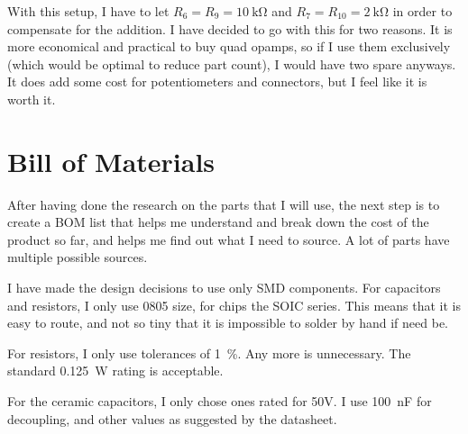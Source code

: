 \documentclass[a4paper]{article}
\begin{document}
With this setup, I have to let $R_6 = R_9 = \SI{10}{\kilo\ohm}$ and $R_7 = R_{10} = \SI{2}{\kilo\ohm}$ in order to compensate for the addition. I have decided to go with this for two reasons. It is more economical and practical to buy quad opamps, so if I use them exclusively (which would be optimal to reduce part count), I would have two spare anyways. It does add some cost for potentiometers and connectors, but I feel like it is worth it.

\section{Bill of Materials}

After having done the research on the parts that I will use, the next step is to create a BOM list that helps me understand and break down the cost of the product so far, and helps me find out what I need to source. A lot of parts have multiple possible sources.

I have made the design decisions to use only SMD components. For capacitors and resistors, I only use 0805 size, for chips the SOIC series. This means that it is easy to route, and not so tiny that it is impossible to solder by hand if need be.

For resistors, I only use tolerances of \SI{1}{\percent}. Any more is unnecessary. The standard \SI{0.125}{\watt} rating is acceptable.

For the ceramic capacitors, I only chose ones rated for 50V. I use \SI{100}{\nano\farad} for decoupling, and other values as suggested by the datasheet.
\end{document}
